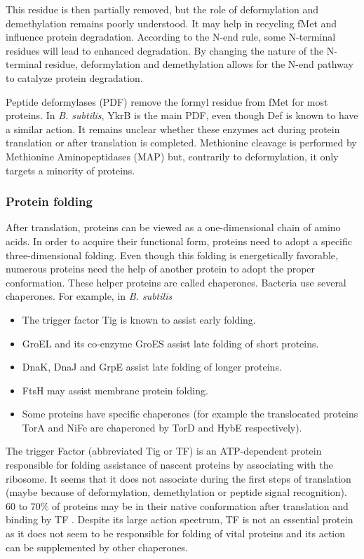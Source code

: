 This residue is then partially removed, but the role of deformylation and demethylation remains poorly understood. It may help in recycling fMet and influence protein degradation. According to the N-end rule, some N-terminal residues will lead to enhanced degradation. By changing the nature of the N-terminal residue, deformylation and demethylation allows for the N-end pathway to catalyze protein degradation.

Peptide deformylases (PDF) remove the formyl residue from fMet for most proteins. In \textit{B. subtilis}, YkrB is the main PDF, even though Def is known to have a similar action. It remains unclear whether these enzymes act during protein translation or after translation is completed. Methionine cleavage is performed by Methionine Aminopeptidases (MAP) but, contrarily to deformylation, it only targets a minority of proteins.

\subsubsection{Protein folding}

After translation, proteins can be viewed as a one-dimensional chain of amino acids. In order to acquire their functional form, proteins need to adopt a specific three-dimensional folding. Even though this folding is energetically favorable, numerous proteins need the help of another protein to adopt the proper conformation. These helper proteins are called chaperones. Bacteria use several chaperones. For example, in \textit{B. subtilis}
\begin{itemize}
\item The trigger factor Tig is known to assist early folding.
\item GroEL and its co-enzyme GroES assist late folding of short proteins.
\item DnaK, DnaJ and GrpE assist late folding of longer proteins.
\item FtsH may assist membrane protein folding.
\item Some proteins have specific chaperones (for example the translocated proteins TorA and NiFe are chaperoned by TorD and HybE respectively).
\end{itemize}

The trigger Factor (abbreviated Tig or TF) is an ATP-dependent protein responsible for folding assistance of nascent proteins by associating with the ribosome. It seems that it does not associate during the first steps of translation (maybe because of deformylation, demethylation or peptide signal recognition). 60 to 70\% of proteins may be in their native conformation after translation and binding by TF \citet{castanie-cornet_chaperone_2014}. Despite its large action spectrum, TF is not an essential protein as it does not seem to be responsible for folding of vital proteins and its action can be supplemented by other chaperones.

